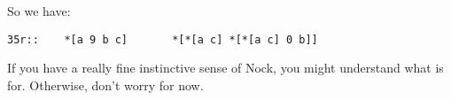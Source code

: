 So we have:

\begin{framed_shaded}
\begin{Verbatim}[fontsize=\relsize{-2.5},fontseries=b,commandchars=\\\{\}]
35r::    *[a 9 b c]       *[*[a c] *[*[a c] 0 b]]
\end{Verbatim}
\end{framed_shaded}

If you have a really fine instinctive sense of Nock, you might
understand what  is for.  Otherwise, don't worry for now.